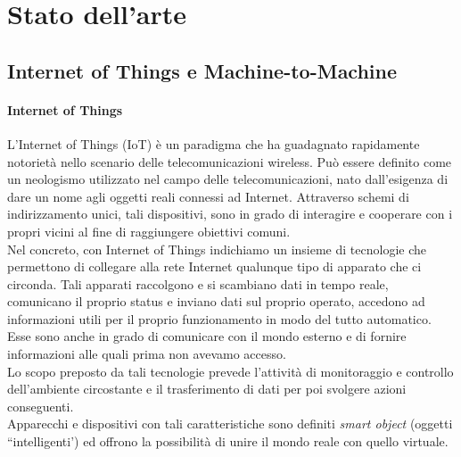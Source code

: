\chapter{Stato dell'arte}
\label{ch:stato_arte}

\section{Internet of Things e Machine-to-Machine}
\subsubsection{Internet of Things}
L'Internet of Things (IoT) è un paradigma che ha guadagnato rapidamente notorietà nello scenario delle telecomunicazioni wireless. Può essere definito come un neologismo utilizzato nel campo delle telecomunicazioni, nato dall'esigenza di dare un nome agli oggetti reali connessi ad Internet. Attraverso schemi di indirizzamento unici, tali dispositivi, sono in grado di interagire e cooperare con i propri vicini al fine di raggiungere obiettivi comuni.\\ %
Nel concreto, con Internet of Things indichiamo un insieme di tecnologie che permettono di collegare alla rete Internet qualunque tipo di apparato che ci circonda. Tali apparati raccolgono e si scambiano dati in tempo reale, comunicano il proprio status e inviano dati sul proprio operato, accedono ad informazioni utili per il proprio funzionamento in modo del tutto automatico. Esse sono anche in grado di comunicare con il mondo esterno e di fornire informazioni alle quali prima non avevamo accesso. \\
Lo scopo preposto da tali tecnologie prevede l'attività di monitoraggio e controllo dell'ambiente circostante e il trasferimento di dati per poi svolgere azioni conseguenti.\\
Apparecchi e dispositivi con tali caratteristiche sono definiti \textit{smart object} (oggetti ``intelligenti') ed offrono la possibilità di unire il mondo reale con quello virtuale.\\


